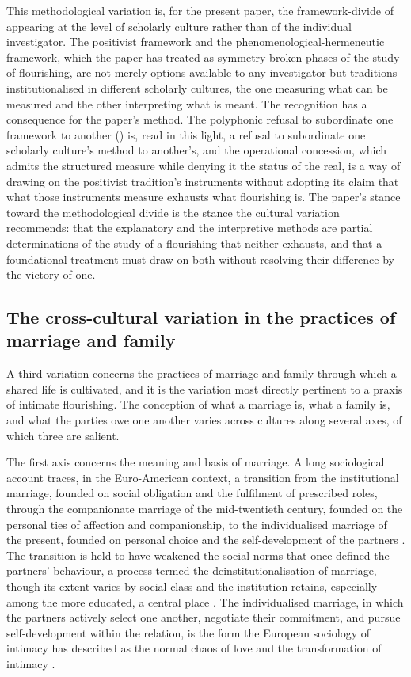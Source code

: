This methodological variation is, for the present paper, the framework-divide of  appearing at the level of scholarly culture rather than of the individual investigator. The positivist framework and the phenomenological-hermeneutic framework, which the paper has treated as symmetry-broken phases of the study of flourishing, are not merely options available to any investigator but traditions institutionalised in different scholarly cultures, the one measuring what can be measured and the other interpreting what is meant. The recognition has a consequence for the paper's method. The polyphonic refusal to subordinate one framework to another () is, read in this light, a refusal to subordinate one scholarly culture's method to another's, and the operational concession, which admits the structured measure while denying it the status of the real, is a way of drawing on the positivist tradition's instruments without adopting its claim that what those instruments measure exhausts what flourishing is. The paper's stance toward the methodological divide is the stance the cultural variation recommends: that the explanatory and the interpretive methods are partial determinations of the study of a flourishing that neither exhausts, and that a foundational treatment must draw on both without resolving their difference by the victory of one.

\subsection{The cross-cultural variation in the practices of marriage and family}
\label{p11:sec:cc-family}

A third variation concerns the practices of marriage and family through which a shared life is cultivated, and it is the variation most directly pertinent to a praxis of intimate flourishing. The conception of what a marriage is, what a family is, and what the parties owe one another varies across cultures along several axes, of which three are salient.

The first axis concerns the meaning and basis of marriage. A long sociological account traces, in the Euro-American context, a transition from the institutional marriage, founded on social obligation and the fulfilment of prescribed roles, through the companionate marriage of the mid-twentieth century, founded on the personal ties of affection and companionship, to the individualised marriage of the present, founded on personal choice and the self-development of the partners \parencite{cherlin2004}. The transition is held to have weakened the social norms that once defined the partners' behaviour, a process termed the deinstitutionalisation of marriage, though its extent varies by social class and the institution retains, especially among the more educated, a central place \parencite{cherlin2020}. The individualised marriage, in which the partners actively select one another, negotiate their commitment, and pursue self-development within the relation, is the form the European sociology of intimacy has described as the normal chaos of love and the transformation of intimacy \parencite{beck1995,giddens1992}.

